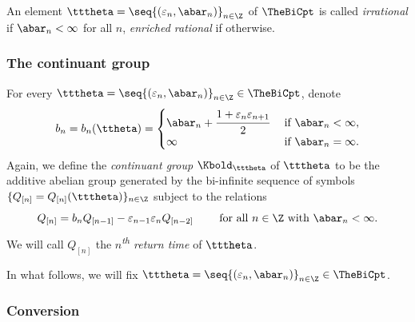 \documentclass{amsart}
\begin{document}
\begin{definition}
    An element $\tttheta = \seq{(\varepsilon_n, \abar_n)}_{n \in \Z}$ of $\TheBiCpt$ is called \emph{irrational} if $\abar_n < \infty$ for all $n$, \emph{enriched rational} if otherwise.
\end{definition}

\subsubsection{The continuant group}
\label{sss:continuant-group}

\begin{definition}
\label{def:time-group-bi-inf}
    For every $\tttheta = \seq{ (\varepsilon_n, \abar_n) }_{n \in \Z} \in \TheBiCpt$, 
    denote
\[
    b_n = b_n(\ttheta) = 
    \begin{cases}
        \abar_n + \cfrac{1+ \varepsilon_n \varepsilon_{n+1}}{2} & \text{ if } \abar_n < \infty, \\
        \infty & \text{ if } \abar_n = \infty.
    \end{cases}
\]
    Again, we define the \emph{continuant group} $\Kbold_{\tttheta}$ of $\tttheta$ to be the additive abelian group generated by the bi-infinite sequence of symbols $\{Q_{[n]}= Q_{[n]}(\tttheta)\}_{n\in\Z}$ subject to the relations
\[
    Q_{[n]} = b_n Q_{[n-1]} - \varepsilon_{n-1} \varepsilon_n  Q_{[n-2]} 
    \qquad \text{ for all }
    n \in \Z \text{ with } \abar_n < \infty.
\]
    We will call $Q_{[n]}$ the \emph{$n$\textsuperscript{th} return time} of $\tttheta$.
\end{definition}

In what follows, we will fix $\tttheta = \seq{ (\varepsilon_n, \abar_n) }_{n \in \Z} \in \TheBiCpt$.

\subsubsection{Conversion}
\label{sss:conversion}
\end{document}
